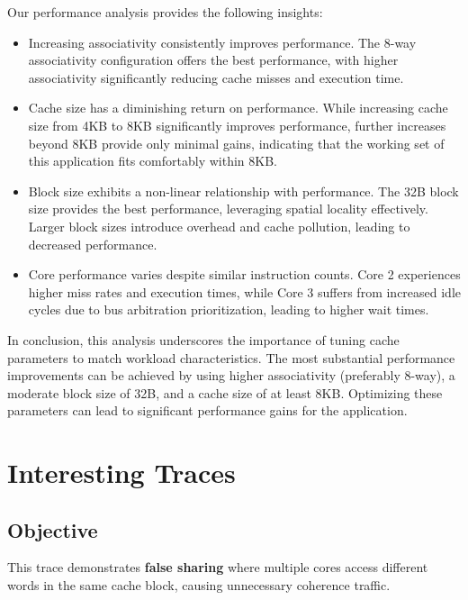 \documentclass[a4paper,12pt]{article}
\begin{document}
Our performance analysis provides the following insights: \begin{itemize} \item Increasing associativity consistently improves performance. The 8-way associativity configuration offers the best performance, with higher associativity significantly reducing cache misses and execution time. \item Cache size has a diminishing return on performance. While increasing cache size from 4KB to 8KB significantly improves performance, further increases beyond 8KB provide only minimal gains, indicating that the working set of this application fits comfortably within 8KB. \item Block size exhibits a non-linear relationship with performance. The 32B block size provides the best performance, leveraging spatial locality effectively. Larger block sizes introduce overhead and cache pollution, leading to decreased performance. \item Core performance varies despite similar instruction counts. Core 2 experiences higher miss rates and execution times, while Core 3 suffers from increased idle cycles due to bus arbitration prioritization, leading to higher wait times. \end{itemize}

In conclusion, this analysis underscores the importance of tuning cache parameters to match workload characteristics. The most substantial performance improvements can be achieved by using higher associativity (preferably 8-way), a moderate block size of 32B, and a cache size of at least 8KB. Optimizing these parameters can lead to significant performance gains for the application.
\section{Interesting Traces}

\vspace{-5pt} %

\subsection*{Objective}
\vspace{-3pt}
This trace demonstrates \textbf{false sharing} where multiple cores access different words in the same cache block, causing unnecessary coherence traffic.

\vspace{5pt}
\end{document}
